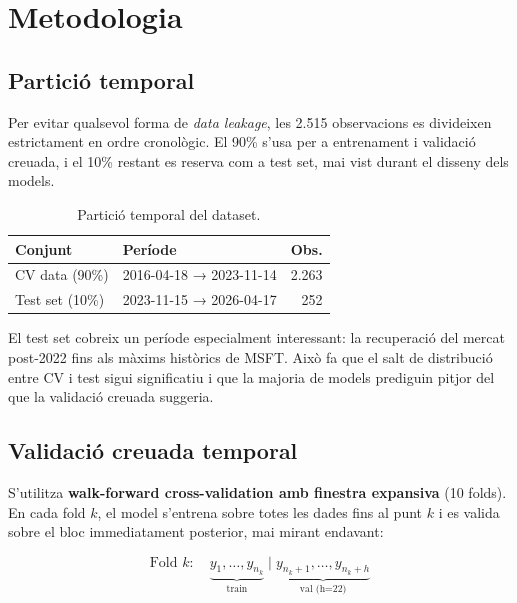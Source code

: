 \documentclass[12pt,a4paper]{article}
\begin{document}
\newpage
\section{Metodologia}

\subsection{Partició temporal}

Per evitar qualsevol forma de \textit{data leakage}, les 2.515 observacions es divideixen
estrictament en ordre cronològic. El 90\% s'usa per a entrenament i validació creuada,
i el 10\% restant es reserva com a test set, mai vist durant el disseny dels models.

\begin{table}[H]
\centering
\begin{tabular}{llr}
\toprule
\textbf{Conjunt} & \textbf{Període} & \textbf{Obs.} \\
\midrule
CV data (90\%)  & 2016-04-18 → 2023-11-14 & 2.263 \\
Test set (10\%) & 2023-11-15 → 2026-04-17 &   252 \\
\bottomrule
\end{tabular}
\caption{Partició temporal del dataset.}
\end{table}

El test set cobreix un període especialment interessant: la recuperació del mercat post-2022
fins als màxims històrics de MSFT. Això fa que el salt de distribució entre CV i test sigui
significatiu i que la majoria de models prediguin pitjor del que la validació creuada suggeria.

\subsection{Validació creuada temporal}

S'utilitza \textbf{walk-forward cross-validation amb finestra expansiva} (10 folds). En cada
fold $k$, el model s'entrena sobre totes les dades fins al punt $k$ i es valida sobre el bloc
immediatament posterior, mai mirant endavant:

\[
\text{Fold } k: \quad \underbrace{y_1, \ldots, y_{n_k}}_{\text{train}} \;|\;
                       \underbrace{y_{n_k+1}, \ldots, y_{n_k+h}}_{\text{val (h=22)}}
\]
\end{document}
